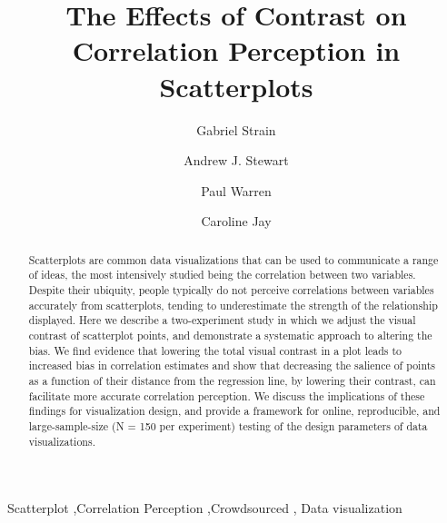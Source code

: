 \documentclass[preprint, 3p,
authoryear]{elsarticle} %
\begin{document}
\begin{frontmatter}

  \title{The Effects of Contrast on Correlation Perception in
Scatterplots}
    \author[CS]{Gabriel Strain%
  }
    \author[CS]{Andrew J. Stewart%
  }
    \author[DOP]{Paul Warren%
  }
    \author[CS]{Caroline Jay%
  }
  
  \begin{abstract}
  Scatterplots are common data visualizations that can be used to
  communicate a range of ideas, the most intensively studied being the
  correlation between two variables. Despite their ubiquity, people
  typically do not perceive correlations between variables accurately
  from scatterplots, tending to underestimate the strength of the
  relationship displayed. Here we describe a two-experiment study in
  which we adjust the visual contrast of scatterplot points, and
  demonstrate a systematic approach to altering the bias. We find
  evidence that lowering the total visual contrast in a plot leads to
  increased bias in correlation estimates and show that decreasing the
  salience of points as a function of their distance from the regression
  line, by lowering their contrast, can facilitate more accurate
  correlation perception. We discuss the implications of these findings
  for visualization design, and provide a framework for online,
  reproducible, and large-sample-size (N = 150 per experiment) testing
  of the design parameters of data visualizations.
  \end{abstract}
    \begin{keyword}
    Scatterplot \sep Correlation Perception \sep Crowdsourced \sep 
    Data visualization
  \end{keyword}
  
 \end{frontmatter}
\end{document}
